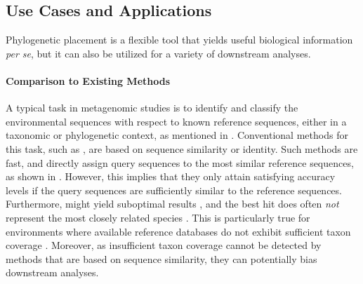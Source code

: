 \subsection{Use Cases and Applications}
\label{ch:Foundations:sec:PhylogeneticPlacement:sub:UseCasesApplications}

Phylogenetic placement is a flexible tool that yields useful biological information \emph{per se},
but it can also be utilized for a variety of downstream analyses.

\paragraph{Comparison to Existing Methods}
\label{ch:Foundations:sec:PhylogeneticPlacement:sub:UseCasesApplications:par:Comparison}

A typical task in metagenomic studies is to identify and classify the environmental sequences with respect
to known reference sequences, either in a taxonomic or phylogenetic context,
as mentioned in .
Conventional methods for this task, such as  \cite{Altschul1990},
are based on sequence similarity or identity.
Such methods are fast, and directly assign query sequences to the most similar reference sequences,
as shown in .
However, this implies that they only attain satisfying accuracy levels
if the query sequences are sufficiently similar to the reference sequences.
Furthermore,  might yield suboptimal results \cite{Shah2018},
and the best  hit does often \emph{not} represent the most closely related species \cite{Koski2001}.
This is particularly true for environments where available reference databases do not exhibit
sufficient taxon coverage \cite{Mahe2017}.
Moreover, as insufficient taxon coverage cannot be detected by methods that are based on sequence similarity,
they can potentially bias downstream analyses.

